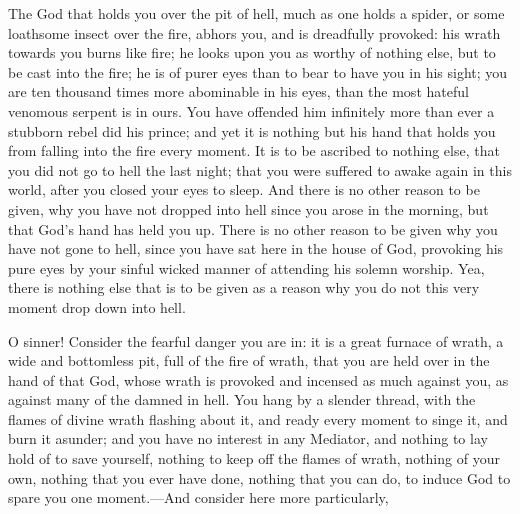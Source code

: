 \documentclass[
]{book}
\begin{document}
The God that holds you over the pit of hell, much as one holds a spider, or some loathsome insect over the fire, abhors you, and is dreadfully provoked: his wrath towards you burns like fire; he looks upon you as worthy of nothing else, but to be cast into the fire; he is of purer eyes than to bear to have you in his sight; you are ten thousand times more abominable in his eyes, than the most hateful venomous serpent is in ours. You have offended him infinitely more than ever a stubborn rebel did his prince; and yet it is nothing but his hand that holds you from falling into the fire every moment. It is to be ascribed to nothing else, that you did not go to hell the last night; that you were suffered to awake again in this world, after you closed your eyes to sleep. And there is no other reason to be given, why you have not dropped into hell since you arose in the morning, but that God's hand has held you up. There is no other reason to be given why you have not gone to hell, since you have sat here in the house of God, provoking his pure eyes by your sinful wicked manner of attending his solemn worship. Yea, there is nothing else that is to be given as a reason why you do not this very moment drop down into hell.

O sinner! Consider the fearful danger you are in: it is a great furnace of wrath, a wide and bottomless pit, full of the fire of wrath, that you are held over in the hand of that God, whose wrath is provoked and incensed as much against you, as against many of the damned in hell. You hang by a slender thread, with the flames of divine wrath flashing about it, and ready every moment to singe it, and burn it asunder; and you have no interest in any Mediator, and nothing to lay hold of to save yourself, nothing to keep off the flames of wrath, nothing of your own, nothing that you ever have done, nothing that you can do, to induce God to spare you one moment.---And consider here more particularly,
\end{document}
